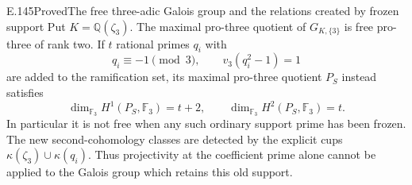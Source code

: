 \begin{result}{E.145}{Proved}{The free three-adic Galois group and the relations created by frozen support}
Put \(K=\mathbb Q(\zeta_3)\). The maximal pro-three
quotient of \(G_{K,\{3\}}\) is free pro-three of
rank two.
If \(t\) rational primes \(q_i\) with
\[
 q_i\equiv-1\pmod3,\qquad v_3(q_i^2-1)=1
 \]
are added to the ramification set, its maximal
pro-three quotient \(P_S\) instead satisfies
\[
 \dim_{\mathbb F_3}H^1(P_S,\mathbb F_3)=t+2,
 \qquad
 \dim_{\mathbb F_3}H^2(P_S,\mathbb F_3)=t .
 \tag{E.145.1}
\]
In particular it is not free when any such
ordinary support prime has been frozen.
The new second-cohomology classes are detected
by the explicit cups
\(\kappa(\zeta_3)\cup\kappa(q_i)\).
Thus projectivity at the coefficient prime
alone cannot be applied to the Galois group
which retains this old support.
\end{result}

